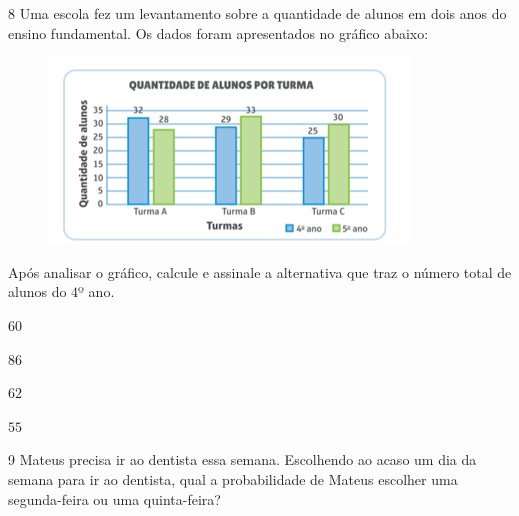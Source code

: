 \num{8} Uma escola fez um levantamento sobre a quantidade de alunos em dois
anos do ensino fundamental. Os dados foram apresentados no gráfico
abaixo:

\begin{figure}
\centering\includegraphics[width=3.78125in,height=1.94792in]{./imgSAEB_6_MAT/media/image110.png}
\end{figure}

Após analisar o gráfico, calcule e assinale a alternativa que traz o
número total de alunos do $4$º ano.

\begin{escolha}
\item $60$
\item $86$
\item $62$
\item $55$
\end{escolha}



\num{9}  Mateus precisa ir ao dentista essa semana. Escolhendo ao acaso um dia
da semana para ir ao dentista, qual a probabilidade de Mateus escolher
uma segunda-feira ou uma quinta-feira?

